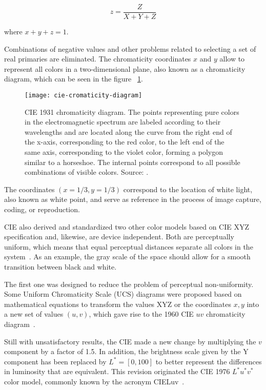 \begin{equation}
  z = \frac{Z}{X + Y + Z}
\label{eq:cie_z}
\end{equation}

where $x + y+ z = 1$.

Combinations of negative values and other problems related to selecting a set of real primaries are eliminated. The chromaticity coordinates $x$ and $y$ allow to represent all colors in a two-dimensional plane, also known as a chromaticity diagram, which can be seen in the figure ~\ref{fig:cie-cromaticity-diagram}.

\begin{figure}[!ht]
  \centering
  \texttt{[image: cie-cromaticity-diagram]}
  \caption[CIE 1931 chromaticity diagram]{CIE 1931 chromaticity diagram. The points representing pure colors in the electromagnetic spectrum are labeled according to their wavelengths and are located along the curve from the right end of the x-axis, corresponding to the red color, to the left end of the same axis, corresponding to the violet color, forming a polygon similar to a horseshoe. The internal points correspond to all possible combinations of visible colors. Source: \citet{ben:09}.}
  \label{fig:cie-cromaticity-diagram} 
\end{figure}

The coordinates $ (x = 1/3, y = 1/3) $ correspond to the location of white light, also known as white point, and serve as reference in the process of image capture, coding, or reproduction.

CIE also derived and standardized two other color models based on CIE XYZ specification and, likewise, are device independent. Both are perceptually uniform, which means that equal perceptual distances separate all colors in the system~\citep{vezhnevets:03}. As an example, the gray scale of the space should allow for a smooth transition between black and white.

The first one was designed to reduce the problem of perceptual non-uniformity. Some Uniform Chromaticity Scale (UCS) diagrams were proposed based on mathematical equations to transform the values XYZ or the coordinates $x, y$ into a new set of values $(u, v)$, which gave rise to the 1960 CIE $uv$ chromaticity diagram~\citep{gevers:12}.

Still with unsatisfactory results, the CIE made a new change by multiplying the $v$ component by a factor of 1.5. In addition, the brightness scale given by the Y component has been replaced by $L^* = [0, 100]$ to better represent the differences in luminosity that are equivalent. This revision originated the CIE 1976 $L^*u^*v^*$ color model, commonly known by the acronym CIELuv~\citep{gevers:12}.

